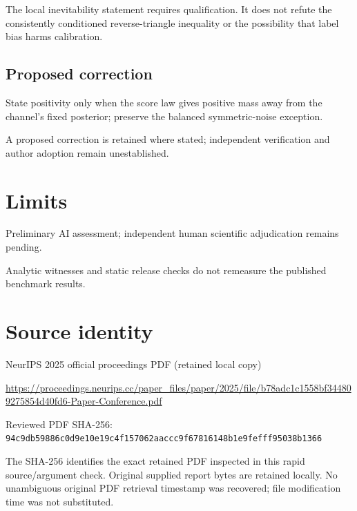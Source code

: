 \documentclass[11pt]{article}
\begin{document}
The local inevitability statement requires qualification. It does not refute the consistently conditioned reverse-triangle inequality or the possibility that label bias harms calibration.

\subsection*{Proposed correction}

State positivity only when the score law gives positive mass away from the channel’s fixed posterior; preserve the balanced symmetric-noise exception.

A proposed correction is retained where stated; independent verification and author adoption remain unestablished.

\section*{Limits}

Preliminary AI assessment; independent human scientific adjudication remains pending.\par

Analytic witnesses and static release checks do not remeasure the published benchmark results.\par

\section*{Source identity}

NeurIPS 2025 official proceedings PDF (retained local copy)

\url{https://proceedings.neurips.cc/paper_files/paper/2025/file/b78adc1c1558bf344809275854d40fd6-Paper-Conference.pdf}

Reviewed PDF SHA-256: \nolinkurl{94c9db59886c0d9e10e19c4f157062aaccc9f67816148b1e9fefff95038b1366}

The SHA-256 identifies the exact retained PDF inspected in this rapid source/argument check. Original supplied report bytes are retained locally. No unambiguous original PDF retrieval timestamp was recovered; file modification time was not substituted.
\end{document}
